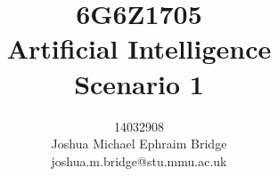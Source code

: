 \documentclass[12pt]{article}
\title{\vspace{1cm}6G6Z1705\\\textbf{Artificial Intelligence}\\\vspace{2cm}Scenario 1\\\vspace{2cm}}
\author{14032908\\Joshua Michael Ephraim Bridge\\joshua.m.bridge@stu.mmu.ac.uk\\\vspace{1cm}}
\begin{document}
\maketitle

\newpage

\doublespacing





\end{document}
